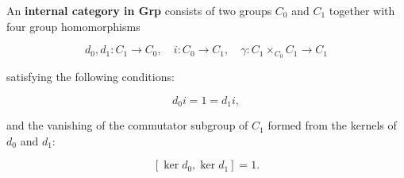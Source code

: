 An \textbf{internal category in Grp} consists of two groups $C_0$ and $C_1$ together with four group homomorphisms

$$d_0, d_1 : C_1 \rightarrow C_0, \quad i : C_0 \rightarrow C_1, \quad \gamma : C_1 \times_{C_0} C_1 \rightarrow C_1$$

satisfying the following conditions:

$$d_0 i = 1 = d_1 i,$$

and the vanishing of the commutator subgroup of $C_1$ formed from the kernels of $d_0$ and $d_1$:

$$[\ker d_0, \ker d_1] = 1.$$
